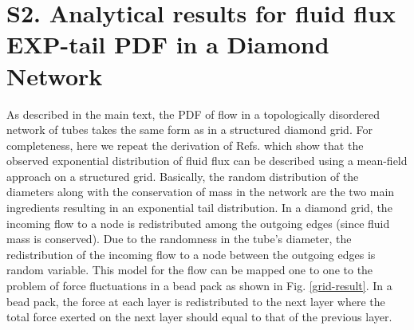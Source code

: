 \documentclass[%
reprint,
 amsmath,amssymb,
 aps,
prl,
]{revtex4-1}
\begin{document}
%
%

\section{S2. Analytical results for fluid flux EXP-tail PDF in a Diamond Network}
\label{s2}
%
%
As described in the main text, the PDF of flow in a topologically disordered network of tubes takes the same form  as in a  structured diamond grid. For completeness, here we repeat the derivation of Refs. \cite{liu1995force,coppersmith1996model,alim2017local} which  show that the observed exponential distribution of fluid flux can be described using a mean-field approach on a structured grid. Basically, the random distribution of the diameters along with the conservation of mass in the network are the two main ingredients resulting in an exponential tail distribution. In a diamond grid, the incoming flow to a node is redistributed among the outgoing edges (since fluid mass is conserved). Due to the randomness in the tube's diameter, the redistribution of the incoming flow to a node between the outgoing edges is random variable.  This model for the flow can be mapped one to one to the problem of force fluctuations in a bead pack \cite{liu1995force,coppersmith1996model,alim2017local} as shown in Fig. \ref{grid-result}. In a bead pack, the force at each layer is redistributed to the next layer where the total force exerted on the next layer should equal to that of the previous layer. 
%
\end{document}
